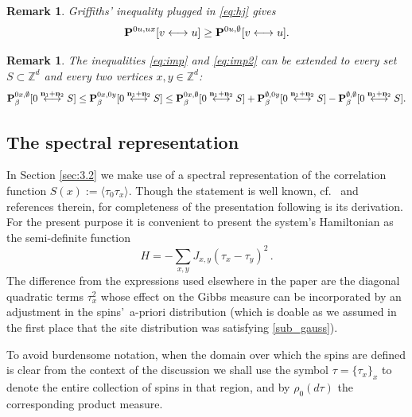 \documentclass[a4paper,oneside,11pt]{article}
\newtheorem{remark}[theorem]{Remark}
\newcommand{\be}[1]{\begin{equation}\label{#1}}
\newcommand{\ee}{\end{equation}}
\numberwithin{equation}{section}
\numberwithin{equation}{section}
\numberwithin{equation}{section}
\newcommand{\bbZ}{\mathbb{Z}}
\def\be{\begin{equation}}
\def\ee{\end{equation}}
\newcommand{\n}{\mathbf{n}}
\begin{document}
\begin{remark}
Griffiths' inequality \cite{Gri67} plugged in \eqref{eq:hj} gives 
\be
\label{eq:imp2}{\bf P}^{0u,ux}[v\longleftrightarrow u]\ge {\bf P}^{0u,\emptyset}[v\longleftrightarrow u].
\ee
\end{remark}
\begin{remark}
The inequalities \eqref{eq:imp} and \eqref{eq:imp2} can be extended to every set $S\subset\bbZ^d$ and every two vertices $x,y\in\bbZ^d$:
\be\label{eq:ag}{\bf P}^{0x,\emptyset}_\beta[0\stackrel{\n_1+\n_2}{\longleftrightarrow}S]\le {\bf P}^{0x,0y}_\beta[0\stackrel{\n_1+\n_2}{\longleftrightarrow}S]\le {\bf P}^{0x,\emptyset}_\beta[0\stackrel{\n_1+\n_2}{\longleftrightarrow}S]+{\bf P}^{\emptyset,0y}_\beta[0\stackrel{\n_1+\n_2}{\longleftrightarrow}S]-{\bf P}^{\emptyset,\emptyset}_\beta[0\stackrel{\n_1+\n_2}{\longleftrightarrow}S].\ee
\end{remark}

\subsection{The spectral representation}

In Section \ref{sec:3.2} we make use of a spectral representation of the correlation function  $S(x):=\langle\tau_0 \tau_x\rangle$.
Though the statement is  well known,  cf.~\cite{GliJaf73} and references therein, for completeness of the presentation following is its derivation.  
For the present purpose it is convenient to present the system's Hamiltonian as the semi-definite function 
\be 
H =  - \sum_{x,y} J_{x,y} (\tau_x - \tau_y)^2 \,. 
\ee 
The difference from the expressions used elsewhere in the paper are the diagonal quadratic terms $\tau_x^2$ whose effect on the Gibbs measure can be incorporated by an adjustment in the spins'~a-priori distribution (which is doable as we assumed in the first place that the site distribution was satisfying \eqref{sub_gauss}).

To avoid burdensome notation, when the domain over which the spins are defined is clear from the context of the discussion we shall use the symbol   
$\tau= \{\tau_x\}_x $ to denote the entire collection of spins in that  region,  and by $\rho_0(d\tau)$ the corresponding product measure.  
\end{document}

